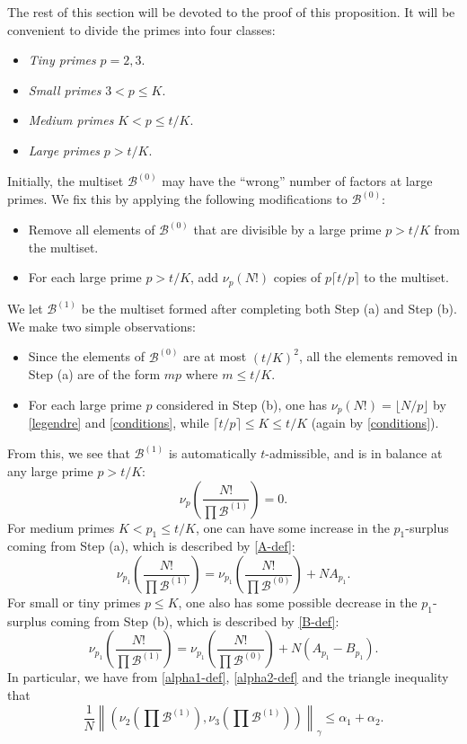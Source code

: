 \documentclass[10pt,a4paper,reqno]{amsart}
\numberwithin{equation}{section}
\theoremstyle{plain}
\theoremstyle{definition}
\newcommand\tuple{{\mathcal B}}
\begin{document}
The rest of this section will be devoted to the proof of this proposition.  It will be convenient to divide the primes into four classes:
  \begin{itemize}
    \item \emph{Tiny primes} $p=2,3$.
    \item \emph{Small primes} $3 < p \leq K$.
    \item \emph{Medium primes} $K < p \leq t/K$.
    \item \emph{Large primes} $p > t/K$.
    \end{itemize}
Initially, the multiset $\tuple^{(0)}$ may have the ``wrong'' number of factors at large primes.  We fix this by applying the following modifications to $\tuple^{(0)}$:
\begin{itemize}
  \item[(a)] Remove all elements of $\tuple^{(0)}$ that are divisible by a large prime $p > t/K$ from the multiset.
  \item[(b)] For each large prime $p > t/K$, add $\nu_p(N!)$ copies of $p \lceil t/p \rceil$ to the multiset.
\end{itemize}
We let $\tuple^{(1)}$ be the multiset formed after completing both Step (a) and Step (b).  We make two simple observations:
\begin{itemize}
\item[(A)] Since the elements of $\tuple^{(0)}$ are at most $(t/K)^2$, all the elements removed in Step (a) are of the form $mp$ where $m \leq t/K$.
\item[(B)] For each large prime $p$ considered in Step (b),  one has $\nu_p(N!) = \lfloor N/p \rfloor$ by \eqref{legendre} and \eqref{conditions}, while $\lceil t/p \rceil \leq K \leq t/K$ (again by \eqref{conditions}).
\end{itemize}
From this, we see that $\tuple^{(1)}$ is automatically $t$-admissible, and is in balance at any large prime $p > t/K$:
$$ \nu_p\left(\frac{N!}{\prod \tuple^{(1)}}\right) = 0.$$
For medium primes $K < p_1 \leq t/K$, one can have some increase in the $p_1$-surplus coming from Step (a), which is described by \eqref{A-def}:
$$ \nu_{p_1}\left(\frac{N!}{\prod \tuple^{(1)}}\right) = \nu_{p_1}\left(\frac{N!}{\prod \tuple^{(0)}}\right) + NA_{p_1}.$$
For small or tiny primes $p \leq K$, one also has some possible decrease in the $p_1$-surplus coming from Step (b), which is described by \eqref{B-def}:
$$ \nu_{p_1}\left(\frac{N!}{\prod \tuple^{(1)}}\right) = \nu_{p_1}\left(\frac{N!}{\prod \tuple^{(0)}}\right) + N(A_{p_1} - B_{p_1}).$$
In particular, we have from \eqref{alpha1-def}, \eqref{alpha2-def} and the triangle inequality that
\begin{equation}\label{alpha-1}
\frac{1}{N} \left\|\left( \nu_2\left(\prod \tuple^{(1)}\right), \nu_3\left(\prod \tuple^{(1)}\right)\right)\right\|_\gamma \leq \alpha_1 + \alpha_2.
\end{equation}
\end{document}
